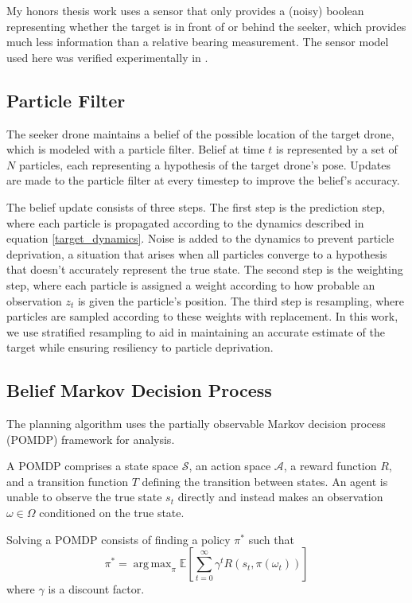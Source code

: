 \documentclass[10pt,twocolumn,letterpaper]{article}
\DeclareMathOperator*{\argmax}{arg\,max}
\begin{document}
My honors thesis work uses a sensor that only provides a (noisy) boolean representing whether the target is in front of or behind the seeker, which provides much less information than a relative bearing measurement.
The sensor model used here was verified experimentally in \cite{sensor_modality}.

\subsection{Particle Filter}
The seeker drone maintains a belief of the possible location of the target drone, which is modeled with a particle filter.
Belief at time $t$ is represented by a set of $N$ particles, each representing a hypothesis of the target drone's pose.
Updates are made to the particle filter at every timestep to improve the belief's accuracy.

The belief update consists of three steps. 
The first step is the prediction step, where each particle is propagated according to the dynamics described in equation \ref{target_dynamics}.
Noise is added to the dynamics to prevent particle deprivation, a situation that arises when all particles converge to a hypothesis that doesn't accurately represent the true state.
The second step is the weighting step, where each particle is assigned a weight according to how probable an observation $z_t$ is given the particle's position.
The third step is resampling, where particles are sampled according to these weights with replacement.
In this work, we use stratified resampling to aid in maintaining an accurate estimate of the target while ensuring resiliency to particle deprivation.

\subsection{Belief Markov Decision Process}

The planning algorithm uses the partially observable Markov decision process (POMDP) framework for analysis.

A POMDP comprises a state space $\mathcal{S}$, an action space $\mathcal{A}$, a reward function $R$, and a transition function $T$ defining the transition between states.
An agent is unable to observe the true state $s_t$ directly and instead makes an observation $\omega \in \Omega$ conditioned on the true state.

Solving a POMDP consists of finding a policy $\pi^*$ such that
\begin{equation}
\pi^* = \argmax_{\pi}{\mathbb{E}\left [ \sum_{t=0}^{\infty}\gamma^{t}R(s_t, \pi(\omega_t)) \right ]}
\label{optimal_policy}
\end{equation}
where $\gamma$ is a discount factor.
\end{document}

